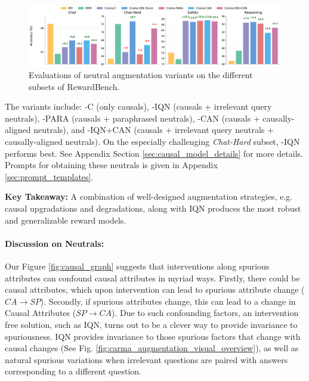 \begin{figure}[!ht]
  \centering
  \includegraphics[width=0.95\columnwidth]{images/gemma9b_rewardbench_subsets_1x4_neutral_augmentations.pdf}
  \caption{Evaluations of neutral augmentation variants on the different subsets of RewardBench.}
  \label{fig:rewardbench_subsets_neutral_ablations}
\end{figure}


The \carma{} variants include: \carma{}-C (only causals), \carma{}-IQN (causals + irrelevant query neutrals), \carma{}-PARA
  (causals + paraphrased neutrals), \carma{}-CAN (causals + causally-aligned neutrals), and  \carma{}-IQN+CAN
  (causals + irrelevant query neutrals + 
  causally-aligned neutrals). On the especially challenging \textit{Chat-Hard} subset, \carma{}-IQN performs best. See Appendix Section \ref{sec:causal_model_details} for more details.  Prompts for obtaining these neutrals is given in Appendix \ref{sec:prompt_templates}.
\vspace{0.03in}
\begin{takeawaybox}
\textbf{Key Takeaway:}  A combination of well-designed augmentation strategies, e.g. causal upgradations and degradations, along with IQN produces the most robust and generalizable reward models.
\end{takeawaybox}

\vspace{-0.1in}
\paragraph{Discussion on Neutrals:} 
Our Figure \ref{fig:causal_graph} suggests that interventions along spurious attributes can confound causal attributes in myriad ways. Firstly, there could be causal attributes, which upon intervention can lead to spurious attribute change ($CA\to SP$). Secondly, if spurious attributes change, this can lead to a change in Causal Attributes ($SP\to CA$). Due to such confounding factors, an intervention free solution, such as IQN, turns out to be a clever way to provide invariance to spuriousness.
IQN provides invariance to those spurious factors that change with causal changes (See Fig. \ref{fig:carma_augmentation_visual_overview}), as well as natural spurious variations when irrelevant questions are paired with answers corresponding to a different question.

